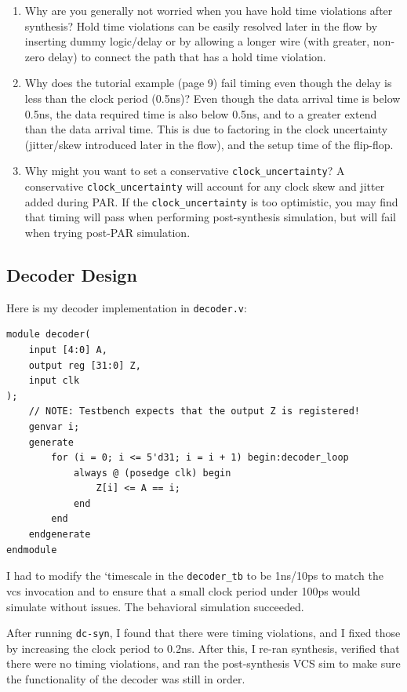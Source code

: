 \documentclass[11pt]{article}
\begin{document}
\begin{enumerate}
	\item Why are you generally not worried when you have hold time violations after synthesis?
	Hold time violations can be easily resolved later in the flow by inserting dummy logic/delay or by allowing a longer wire (with greater, non-zero delay) to connect the path that has a hold time violation.
	
	\item Why does the tutorial example (page 9) fail timing even though the delay is less than the clock period (0.5ns)?
	Even though the data arrival time is below 0.5ns, the data required time is also below 0.5ns, and to a greater extend than the data arrival time. This is due to factoring in the clock uncertainty (jitter/skew introduced later in the flow), and the setup time of the flip-flop.
	
	\item Why might you want to set a conservative \verb|clock_uncertainty|?
	A conservative \verb|clock_uncertainty| will account for any clock skew and jitter added during PAR. If the \verb|clock_uncertainty| is too optimistic, you may find that timing will pass when performing post-synthesis simulation, but will fail when trying post-PAR simulation.
\end{enumerate}

\subsection{Decoder Design}

Here is my decoder implementation in \verb|decoder.v|:

\begin{verbatim}
module decoder(
	input [4:0] A,
	output reg [31:0] Z,
	input clk
);
	// NOTE: Testbench expects that the output Z is registered!
	genvar i;
	generate
		for (i = 0; i <= 5'd31; i = i + 1) begin:decoder_loop
			always @ (posedge clk) begin
				Z[i] <= A == i;
			end
		end
	endgenerate
endmodule
\end{verbatim}

I had to modify the `timescale in the \verb|decoder_tb| to be 1ns/10ps to match the vcs invocation and to ensure that a small clock period under 100ps would simulate without issues. The behavioral simulation succeeded.

After running \verb|dc-syn|, I found that there were timing violations, and I fixed those by increasing the clock period to 0.2ns. After this, I re-ran synthesis, verified that there were no timing violations, and ran the post-synthesis VCS sim to make sure the functionality of the decoder was still in order.
\end{document}
